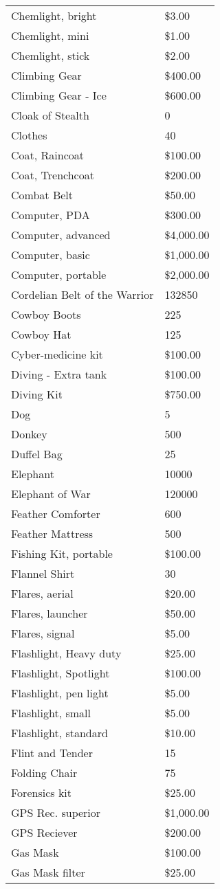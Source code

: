 \documentclass[twoside]{book}
\begin{document}
\begin{longtable}{p{1.25in}l}
      \raggedright Chemlight, bright & \$3.00 \tabularnewline
      \raggedright Chemlight, mini & \$1.00 \tabularnewline
      \raggedright Chemlight, stick & \$2.00 \tabularnewline
      \raggedright Climbing Gear & \$400.00 \tabularnewline
      \raggedright Climbing Gear - Ice & \$600.00 \tabularnewline
      \raggedright Cloak of Stealth & 0 \tabularnewline
      \raggedright Clothes & 40 \tabularnewline
      \raggedright Coat, Raincoat & \$100.00 \tabularnewline
      \raggedright Coat, Trenchcoat & \$200.00 \tabularnewline
      \raggedright Combat Belt & \$50.00 \tabularnewline
      \raggedright Computer, PDA & \$300.00 \tabularnewline
      \raggedright Computer, advanced & \$4,000.00 \tabularnewline
      \raggedright Computer, basic & \$1,000.00 \tabularnewline
      \raggedright Computer, portable & \$2,000.00 \tabularnewline
      \raggedright Cordelian Belt of the Warrior
           & 132850 \tabularnewline
      \raggedright Cowboy Boots & 225 \tabularnewline
      \raggedright Cowboy Hat & 125 \tabularnewline
      \raggedright Cyber-medicine kit & \$100.00 \tabularnewline
      \raggedright Diving - Extra tank & \$100.00 \tabularnewline
      \raggedright Diving Kit & \$750.00 \tabularnewline
      \raggedright Dog & 5 \tabularnewline
      \raggedright Donkey & 500 \tabularnewline
      \raggedright Duffel Bag & 25 \tabularnewline
      \raggedright Elephant & 10000 \tabularnewline
      \raggedright Elephant of War & 120000 \tabularnewline
      \raggedright Feather Comforter & 600 \tabularnewline
      \raggedright Feather Mattress & 500 \tabularnewline
      \raggedright Fishing Kit, portable & \$100.00 \tabularnewline
      \raggedright Flannel Shirt & 30 \tabularnewline
      \raggedright Flares, aerial & \$20.00 \tabularnewline
      \raggedright Flares, launcher & \$50.00 \tabularnewline
      \raggedright Flares, signal & \$5.00 \tabularnewline
      \raggedright Flashlight, Heavy duty & \$25.00 \tabularnewline
      \raggedright Flashlight, Spotlight & \$100.00 \tabularnewline
      \raggedright Flashlight, pen light & \$5.00 \tabularnewline
      \raggedright Flashlight, small & \$5.00 \tabularnewline
      \raggedright Flashlight, standard & \$10.00 \tabularnewline
      \raggedright Flint and Tender & 15 \tabularnewline
      \raggedright Folding Chair & 75 \tabularnewline
      \raggedright Forensics kit & \$25.00 \tabularnewline
      \raggedright GPS Rec. superior & \$1,000.00 \tabularnewline
      \raggedright GPS Reciever & \$200.00 \tabularnewline
      \raggedright Gas Mask & \$100.00 \tabularnewline
      \raggedright Gas Mask filter & \$25.00 \tabularnewline

\end{longtable}
\end{document}
